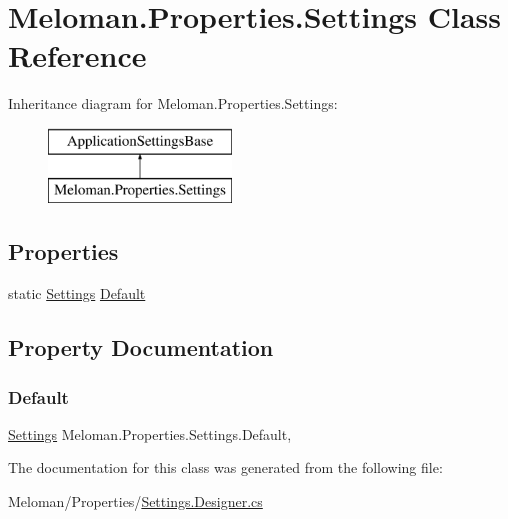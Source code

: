 \hypertarget{class_meloman_1_1_properties_1_1_settings}{}\section{Meloman.\+Properties.\+Settings Class Reference}
\label{class_meloman_1_1_properties_1_1_settings}
Inheritance diagram for Meloman.\+Properties.\+Settings\+:\begin{figure}[H]
\begin{center}
\leavevmode
\includegraphics[height=2.000000cm]{class_meloman_1_1_properties_1_1_settings}
\end{center}
\end{figure}
\subsection*{Properties}
\begin{DoxyCompactItemize}
\item 
static \mbox{\hyperlink{class_meloman_1_1_properties_1_1_settings}{Settings}} \mbox{\hyperlink{class_meloman_1_1_properties_1_1_settings_a5cbe845c8233ea126dde9afde9ee3a2d}{Default}}
\end{DoxyCompactItemize}


\subsection{Property Documentation}
\mbox{\label{class_meloman_1_1_properties_1_1_settings_a5cbe845c8233ea126dde9afde9ee3a2d}} 
\subsubsection{\texorpdfstring{Default}{Default}}
{\footnotesize\ttfamily \mbox{\hyperlink{class_meloman_1_1_properties_1_1_settings}{Settings}} Meloman.\+Properties.\+Settings.\+Default\hspace{0.3cm}{\ttfamily [static]}, {\ttfamily [get]}}



The documentation for this class was generated from the following file\+:\begin{DoxyCompactItemize}
\item 
Meloman/\+Properties/\mbox{\hyperlink{_settings_8_designer_8cs}{Settings.\+Designer.\+cs}}\end{DoxyCompactItemize}

